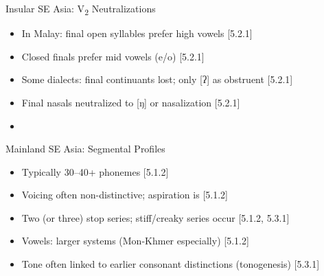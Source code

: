 \documentclass{beamer}
\newcommand{\booksrc}[1]{\hfill {\tiny [#1]}}
\begin{document}
\begin{frame}{Insular SE Asia: V\textsubscript{2} Neutralizations}
\begin{itemize}
\item In Malay: final open syllables prefer high vowels \booksrc{5.2.1}
\item Closed finals prefer mid vowels (e/o) \booksrc{5.2.1}
\item Some dialects: final continuants lost; only [ʔ] as obstruent \booksrc{5.2.1}
\item Final nasals neutralized to [ŋ] or nasalization \booksrc{5.2.1}
\item %
\end{itemize}
\end{frame}


\begin{frame}{Mainland SE Asia: Segmental Profiles}
\begin{itemize}
\item Typically 30–40+ phonemes \booksrc{5.1.2}
\item Voicing often non-distinctive; aspiration is \booksrc{5.1.2}
\item Two (or three) stop series; stiff/creaky series occur \booksrc{5.1.2, 5.3.1}
\item Vowels: larger systems (Mon-Khmer especially) \booksrc{5.1.2}
\item Tone often linked to earlier consonant distinctions (tonogenesis) \booksrc{5.3.1}
\end{itemize}
\end{frame}
\end{document}

